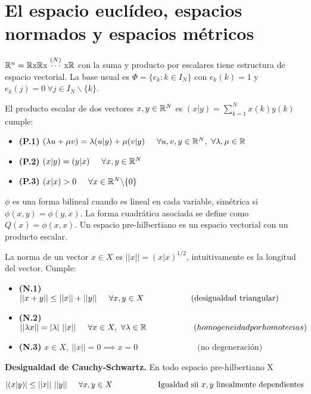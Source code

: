\section{El espacio euclídeo, espacios normados y espacios métricos}

$\mathbb{R}^n = \mathbb{R} \text{x}\mathbb{R} \text{x }\overset{(N)}{\cdots} \text{ x}\mathbb{R}$ con la suma y producto por escalares tiene estructura de espacio vectorial. La base usual es $\Phi =\{e_k : k\in I_N\}$ con $e_k(k)=1$ y $e_k(j) = 0 \ \forall j\in I_N\backslash \{k\}$.

El producto escalar de dos vectores $x,y\in \mathbb{R}^N$ es $(x|y) = \sum_{k=1}^{N} x(k) y(k)$ cumple:
\begin{itemize}
	\item \textbf{(P.1)} $(\lambda u+\mu v) = \lambda (u|y) +\mu (v|y) \hspace{0.5cm} \forall u,v,y\in\R^N, \ \forall \lambda,\mu\in\R$
	\item \textbf{(P.2)} $(x|y) = (y|x) \hspace{0.5cm} \forall x,y\in\mathbb{R}^N$
	\item \textbf{(P.3)} $(x|x)>0 \hspace{0.5cm} \forall x\in\mathbb{R}^N\backslash\{0\}$
\end{itemize}
$\phi$ es una forma bilineal cuando es lineal en cada variable, simétrica si $\phi(x,y) = \phi(y,x)$. La forma cuadrática asociada se define como $Q(x) = \phi(x,x)$.
Un espacio pre-hilbertiano es un espacio vectorial con un producto escalar. 

La norma de un vector $x\in X$ es $||x|| = (x|x)^{1/2}$, intuitivamente es la longitud del vector. Cumple:
\begin{itemize}
	\item \textbf{(N.1)} $ ||x+y|| \leq ||x||+||y||\hspace{0.5cm} \forall x,y\in X \hspace{2cm} \text{(desigualdad triangular)}$
	\item \textbf{(N.2)} $||\lambda x|| = |\lambda| \ ||x|| \hspace{0.5cm} \forall x\in X,\ \forall\lambda\in\mathbb{R} \hspace{2cm}(homogeneidad por homotecias)$
	\item \textbf{(N.3)} $x\in X, \ ||x||=0 \implies x=0 \hspace{3cm} \text{(no degeneración)}$
\end{itemize}
\textbf{Desigualdad de Cauchy-Schwartz.} En todo espacio pre-hilbertiano X
\begin{center}
$ |(x|y)| \leq ||x|| \ ||y||\hspace{0.5cm}\forall x,y\in X
\hspace{2cm} \text{Igualdad sii $x,y$ linealmente dependientes}  $
\end{center}


